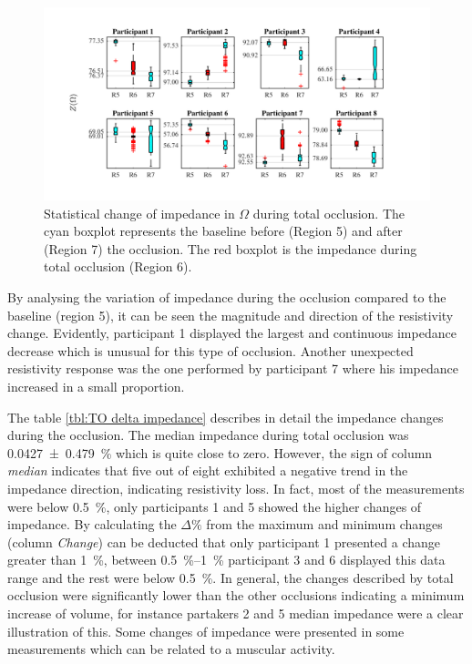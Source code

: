 \begin{figure}[htpb]
	\centering
	\includegraphics[width=15cm,keepaspectratio]{figure_vop_7}    
	\caption[Change of impedance during total occlusion]{Statistical change of impedance in $\Omega$ during total occlusion. The cyan boxplot represents the baseline before (Region 5) and after (Region 7) the occlusion. The red boxplot is the impedance during total occlusion (Region 6).}
	\label{fig:total arterial statistics impedance}
\end{figure} 

By analysing the variation of impedance during the occlusion compared to the baseline (region 5), it can be seen the magnitude and direction of the resistivity change. Evidently, participant 1 displayed the largest and continuous impedance decrease which is unusual for this type of occlusion. Another unexpected resistivity response was the one performed by participant 7 where his impedance increased in a small proportion.  

The table \ref{tbl:TO delta impedance} describes in detail the impedance changes during the occlusion. The median impedance during total occlusion was \SI{0.0427(04790)}{\percent} which is quite close to zero. However, the sign of column \textit{median} indicates that five out of eight exhibited a negative trend in the impedance direction, indicating resistivity loss. In fact, most of the measurements were below \SI{0.5}{\percent}, only participants 1 and 5 showed the higher changes of impedance. By calculating the $\Delta \%$  from the maximum and minimum changes (column \textit{Change}) can be deducted that only participant 1 presented a change greater than \SI{1}{\percent}, between \SIrange{0.5}{1}{\percent} participant 3 and 6 displayed this data range and the rest were below \SI{0.5}{\percent}. In general, the changes described by total occlusion were significantly lower than the other occlusions indicating a minimum increase of volume, for instance partakers 2 and 5 median impedance were a clear illustration of this. Some changes of impedance were presented in some measurements which can be related to a muscular activity. 

